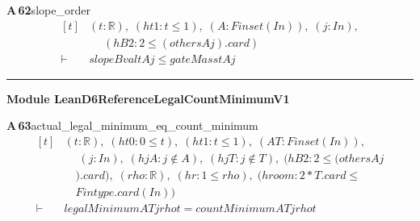 \documentclass[conference]{IEEEtran}
\theoremstyle{definition}
\newcommand{\lean}[1]{\textsf{\footnotesize #1}}
\begin{document}
\noindent\textbf{A\,62}\quad\lean{slope\_order}
{\footnotesize\[ \begin{aligned}[t]
&(\mathit{t} : \mathbb{R} ),\; (\mathit{ht1} : \mathit{t} \leq 1),\; (\mathit{A} : \mathit{Finset} (\mathit{I} \mathit{n})),\; (\mathit{j} : \mathit{I} \mathit{n}),\\
&\quad \; (\mathit{hB2} : 2 \leq (\mathit{others} \mathit{A} \mathit{j}).\mathit{card})\\
\vdash\;&\mathit{slopeBval} \mathit{t} \mathit{A} \mathit{j} \leq \mathit{gateMass} \mathit{t} \mathit{A} \mathit{j}
\end{aligned} \]}

\vspace{4pt}\noindent\rule{\columnwidth}{0.4pt}\par\vspace{2pt}
\noindent\textbf{Module \lean{LeanD6ReferenceLegalCountMinimumV1}}\par\vspace{3pt}

\noindent\textbf{A\,63}\quad\lean{actual\_legal\_minimum\_eq\_count\_minimum}
{\footnotesize\[ \begin{aligned}[t]
&(\mathit{t} : \mathbb{R} ),\; (\mathit{ht0} : 0 \leq \mathit{t}),\; (\mathit{ht1} : \mathit{t} \leq 1),\; (\mathit{A} \mathit{T} : \mathit{Finset} (\mathit{I} \mathit{n})),\\
&\quad \; (\mathit{j} : \mathit{I} \mathit{n}),\; (\mathit{hjA} : \mathit{j} \notin \mathit{A}),\; (\mathit{hjT} : \mathit{j} \notin \mathit{T}),\; (\mathit{hB2} : 2 \leq (\mathit{others} \mathit{A} \mathit{j}\\
&\quad ).\mathit{card}),\; (\mathit{rho} : \mathbb{R} ),\; (\mathit{hr} : 1 \leq \mathit{rho}),\; (\mathit{hroom} : 2*\mathit{T}.\mathit{card} \leq\\
&\quad \mathit{Fintype}.\mathit{card} (\mathit{I} \mathit{n}))\\
\vdash\;&\mathit{legalMinimum} \mathit{A} \mathit{T} \mathit{j} \mathit{rho} \mathit{t} = \mathit{countMinimum} \mathit{A} \mathit{T} \mathit{j} \mathit{rho} \mathit{t}
\end{aligned} \]}
\end{document}

